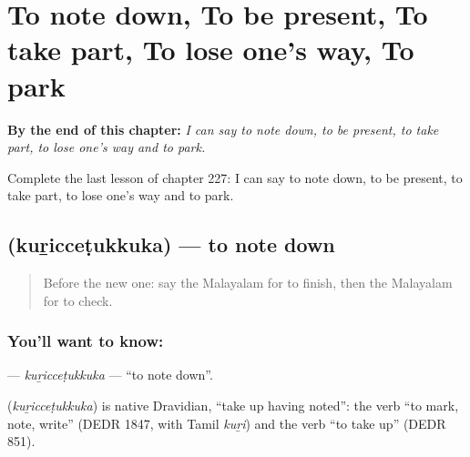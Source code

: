 
\chapter{To note down, To be present, To take part, To lose one's way, To park}
\label{ch:ml-to-note-down-to-be-present-to-take-part-to-lose-one-s-way-to-park}

\begin{chapteropening}
\textbf{By the end of this chapter:} \emph{I can say to note down, to be present, to take part, to lose one's way and to park.}

Complete the last lesson of chapter 227: I can say to note down, to be present, to take part, to lose one's way and to park.
\end{chapteropening}

\section[\texorpdfstring{\ml{കുറിച്ചെടുക്കുക} (kuṟicceṭukkuka)}{കുറിച്ചെടുക്കുക (kuṟicceṭukkuka)}]{ (kuṟicceṭukkuka) — to note down}

\label{lesson:ML-C227-kuriccetukkuka}



\begin{quote}
Before the new one: say the Malayalam for to finish, then the Malayalam for to check.
\end{quote}

\subsection*{You'll want to know: }
\textbf{} — \emph{kuṟicceṭukkuka} — \textquotedblleft{}to note down\textquotedblright{}.

\begin{cousinweb}
\textbf{} (\emph{kuṟicceṭukkuka}) is native Dravidian, \textquotedblleft{}take up having noted\textquotedblright{}: the verb \textquotedblleft{}to mark, note, write\textquotedblright{} (DEDR 1847, with Tamil \emph{kuṟi}) and the verb \textquotedblleft{}to take up\textquotedblright{} (DEDR 851).
\end{cousinweb}

